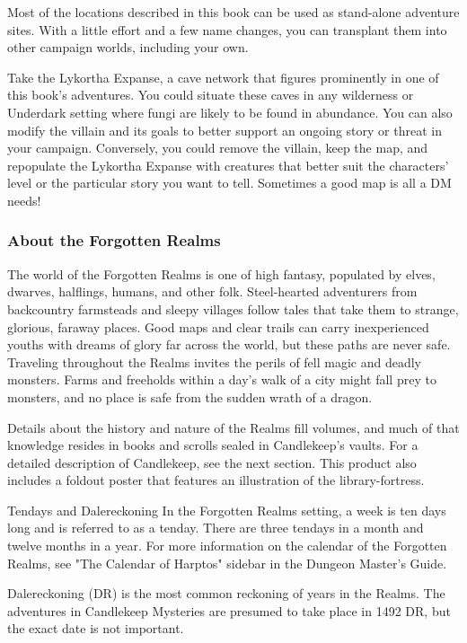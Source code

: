 \documentclass[10pt,a4paper,twoside,bg=print,twocolumn,openany,nodeprecatedcode]{dndbook}
\begin{document}
Most of the locations described in this book can be used as stand-alone adventure sites. With a little effort and a few name changes, you can transplant them into other campaign worlds, including your own.

Take the Lykortha Expanse, a cave network that figures prominently in one of this book's adventures. You could situate these caves in any wilderness or Underdark setting where fungi are likely to be found in abundance. You can also modify the villain and its goals to better support an ongoing story or threat in your campaign. Conversely, you could remove the villain, keep the map, and repopulate the Lykortha Expanse with creatures that better suit the characters' level or the particular story you want to tell. Sometimes a good map is all a DM needs!

\subsubsection{About the Forgotten Realms}
The world of the Forgotten Realms is one of high fantasy, populated by elves, dwarves, halflings, humans, and other folk. Steel-hearted adventurers from backcountry farmsteads and sleepy villages follow tales that take them to strange, glorious, faraway places. Good maps and clear trails can carry inexperienced youths with dreams of glory far across the world, but these paths are never safe. Traveling throughout the Realms invites the perils of fell magic and deadly monsters. Farms and freeholds within a day's walk of a city might fall prey to monsters, and no place is safe from the sudden wrath of a dragon.

Details about the history and nature of the Realms fill volumes, and much of that knowledge resides in books and scrolls sealed in Candlekeep's vaults. For a detailed description of Candlekeep, see the next section. This product also includes a foldout poster that features an illustration of the library-fortress.

\begin{DndSidebar}[float=!b]{Tendays and Dalereckoning}
In the Forgotten Realms setting, a week is ten days long and is referred to as a tenday. There are three tendays in a month and twelve months in a year. For more information on the calendar of the Forgotten Realms, see "The Calendar of Harptos" sidebar in the Dungeon Master's Guide.



Dalereckoning (DR) is the most common reckoning of years in the Realms. The adventures in Candlekeep Mysteries are presumed to take place in 1492 DR, but the exact date is not important.



\end{DndSidebar}
\end{document}
